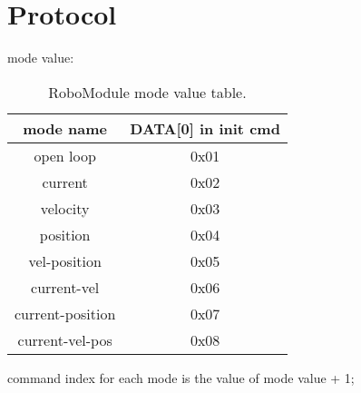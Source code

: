 \section{Protocol}
mode value:
\begin{table}[htb!]
	\caption[RoboModule mode value]{RoboModule mode value table.}
	\begin{tabular}{ c c }
		\toprule
		mode name & DATA[0] in init cmd \\
		\midrule
		open loop  & 0x01  \\
		\midrule
		current  & 0x02  \\
		\midrule
		velocity  & 0x03  \\
		\midrule
		position  & 0x04  \\
		\midrule
		vel-position  & 0x05 \\
		\midrule
		current-vel  & 0x06  \\
		\midrule
		current-position  & 0x07  \\
		\midrule
		current-vel-pos  & 0x08  \\
		\bottomrule
	\end{tabular}
\end{table}

command index for each mode is the value of mode value + 1;